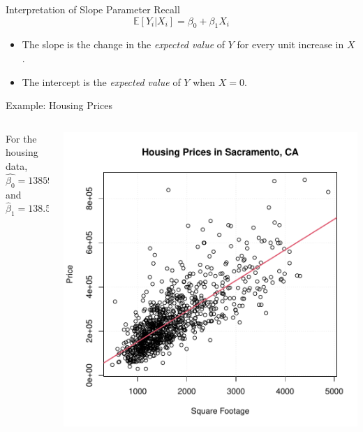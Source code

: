 \documentclass[handout]{beamer}
\begin{document}
\begin{frame}{Interpretation of Slope Parameter}
    Recall 
    \begin{equation*}
        \mathbb{E}[Y_i | X_i] = \beta_0 + \beta_1 X_i
    \end{equation*}
    \begin{itemize}
        \item The slope is the change in the \textit{expected value} of $Y$ for every unit increase in $X$. 
        \item The intercept is the \textit{expected value} of $Y$ when $X = 0$.
    \end{itemize}
\end{frame}

\begin{frame}{Example: Housing Prices}
    \begin{columns}
        \begin{column}{0.5\linewidth}
            For the housing data, 
            \begin{equation*}
                \hat{\beta_0} = 13859.393
            \end{equation*}
            and 
            \begin{equation*}
                \hat{\beta}_1 = 138.546
            \end{equation*}
        \end{column}
        \begin{column}{0.5\linewidth}
            \includegraphics[width=\linewidth]{figures/sacramento_ls.pdf}
        \end{column}
    \end{columns}
\end{frame}
\end{document}
